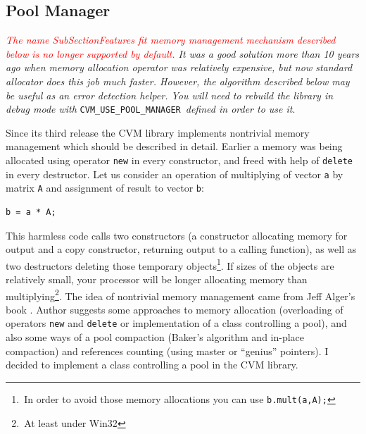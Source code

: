 \subsection{Pool Manager}
\textit{\textcolor{red}{The%
\pdfdest name {SubSectionFeatures} fit{}
memory management mechanism described below is no longer supported
by default.} It was a good solution more than 10 years ago when memory allocation
operator was relatively expensive, but now standard allocator does this job
much faster. However, the algorithm described below may be useful as
an error detection helper. You will need to rebuild the library in debug mode
with}
\verb"CVM_USE_POOL_MANAGER"\, \textit{defined in order to use it}.

Since its third release the CVM library implements
nontrivial memory management
which should be described in detail. Earlier a memory was being
allocated using operator \verb"new" in every constructor, and
freed with help of \verb"delete" in every destructor. Let us
consider an operation of multiplying of vector \verb'a' by matrix
\verb'A' and assignment of result to vector \verb'b':
\begin{Verbatim}
b = a * A;
\end{Verbatim}
This harmless code calls two constructors (a constructor allocating
memory for output and a copy constructor, returning output to
a calling function), as well as two destructors deleting those
temporary objects\footnote{\,In order to avoid those memory
allocations you can use \verb"b.mult(a,A);"}. If sizes of the
objects are relatively small, your processor will be longer
allocating memory than multiplying\footnote{\,At least under Win32}.
The idea of nontrivial memory management came from Jeff Alger's book
. Author suggests some approaches to
memory allocation (overloading of operators \verb"new" and
\verb"delete" or implementation of a class controlling a pool), and
also some ways of a pool compaction (Baker's algorithm and in-place
compaction) and references counting (using master or ``genius''
pointers). I decided to implement
a class controlling a pool in the CVM library.

